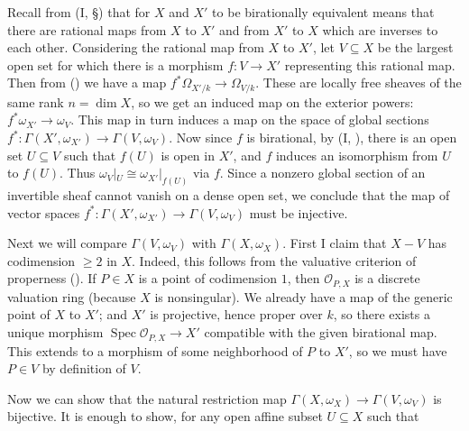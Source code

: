 {\Proof Recall from (I, \S{}) that for $X$ and $X'$ to be birationally equivalent means that there are rational maps from $X$ to $X'$ and from $X'$ to $X$ which are inverses to each other. Considering the rational map from $X$ to $X'$, let $V\subseteq X$ be the largest open set for which there is a morphism $f\colon V\to X'$ representing this rational map. Then from () we have a map $f^*\Omega_{X'/k}\to\Omega_{V/k}$. These are locally free sheaves of the same rank $n=\dim X$, so we get an induced map on the exterior powers: $f^*\omega_{X'}\to\omega_V$. This map in turn induces a map on the space of global sections $f^*\colon\Gamma(X',\omega_{X'})\to\Gamma(V,\omega_V)$. Now since $f$ is birational, by (I, ), there is an open set $U\subseteq V$ such that $f(U)$ is open in $X'$, and $f$ induces an isomorphism from $U$ to $f(U)$. Thus $\omega_V|_U\cong\omega_{X'}|_{f(U)}$ via $f$. Since a nonzero global section of an invertible sheaf cannot vanish on a dense open set, we conclude that the map of vector spaces $f^*\colon\Gamma(X',\omega_{X'})\to\Gamma(V,\omega_V)$ must be injective.

Next we will compare $\Gamma(V,\omega_V)$ with $\Gamma(X,\omega_X)$. First I claim that $X-V$ has codimension $\ge2$ in $X$. Indeed, this follows from the valuative criterion of properness (). If $P\in X$ is a point of codimension $1$, then $\mathcal O_{P,X}$ is a discrete valuation ring (because $X$ is nonsingular). We already have a map of the generic point of $X$ to $X'$; and $X'$ is projective, hence proper over $k$, so there exists a unique morphism $\operatorname{Spec}\mathcal O_{P,X}\to X'$ compatible with the given birational map. This extends to a morphism of some neighborhood of $P$ to $X'$, so we must have $P\in V$ by definition of $V$.

Now we can show that the natural restriction map $\Gamma(X,\omega_X)\to\Gamma(V,\omega_V)$ is bijective. It is enough to show, for any open affine subset $U\subseteq X$ such that
}
